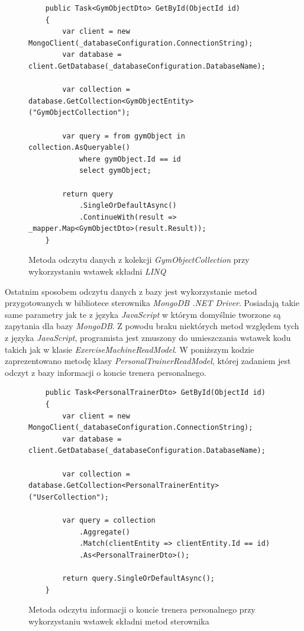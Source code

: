 \documentclass[a4paper,twoside,12pt]{book}
\begin{document}
\begin{figure} [H]
	\centering
	\begin{lstlisting}			
    public Task<GymObjectDto> GetById(ObjectId id)
	{
		var client = new MongoClient(_databaseConfiguration.ConnectionString);
		var database = client.GetDatabase(_databaseConfiguration.DatabaseName);
	
		var collection = database.GetCollection<GymObjectEntity>("GymObjectCollection");

		var query = from gymObject in collection.AsQueryable()
			where gymObject.Id == id
			select gymObject;

		return query
			.SingleOrDefaultAsync()
			.ContinueWith(result => _mapper.Map<GymObjectDto>(result.Result));
	}
	\end{lstlisting}
\caption{Metoda odczytu danych z kolekcji \textit{GymObjectCollection} przy wykorzystaniu wstawek składni \textit{LINQ}}
\label{fig:gymObjectReadModel}
\end{figure}

Ostatnim sposobem odczytu danych z bazy jest wykorzystanie metod przygotowanych w bibliotece sterownika \textit{MongoDB .NET Driver}. Posiadają takie same parametry jak te z języka \textit{JavaScript} w którym domyślnie tworzone są zapytania dla bazy \textit{MongoDB}. Z powodu braku niektórych metod względem tych z języka \textit{JavaScript}, programista jest zmuszony do umieszczania wstawek kodu takich jak w klasie \textit{ExerciseMachineReadModel}. W poniższym kodzie zaprezentowano metodę klasy 
\textit{PersonalTrainerReadModel}, której zadaniem jest odczyt z bazy informacji o koncie trenera personalnego.
\begin{figure} [H]
	\centering
	\begin{lstlisting}			
    public Task<PersonalTrainerDto> GetById(ObjectId id)
	{
		var client = new MongoClient(_databaseConfiguration.ConnectionString);
		var database = client.GetDatabase(_databaseConfiguration.DatabaseName);

		var collection = database.GetCollection<PersonalTrainerEntity>("UserCollection");

		var query = collection
			.Aggregate()
			.Match(clientEntity => clientEntity.Id == id)
			.As<PersonalTrainerDto>();

		return query.SingleOrDefaultAsync();
	}
	\end{lstlisting}
	\caption{Metoda odczytu informacji o koncie trenera personalnego przy wykorzystaniu wstawek składni metod sterownika}
	\label{fig:personalTrainerReadModel}
\end{figure}
\end{document}
